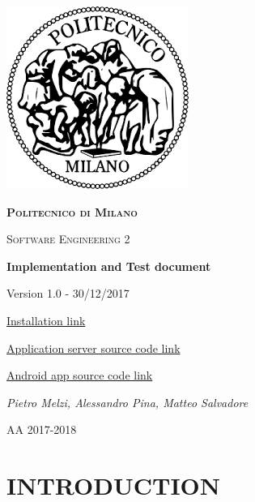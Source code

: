 \documentclass[11pt]{report}
\begin{document}
	\begin{titlepage}
		\centering
		\includegraphics{logo.png}\par\vspace{1cm}
		{\scshape\LARGE\bfseries Politecnico di Milano \par}
		\vspace{1cm}
		{\scshape\Large Software Engineering 2\par}
		\vspace{1.5cm}
		{\Huge\bfseries Implementation and Test document\par}
		\vspace{1cm}
		{\small Version 1.0 - 30/12/2017\par}
		\vspace{1cm}
		{\normalsize\href{https://github.com/JustSalva/MelziPinaSalvadore/tree/master/DeliveryFolder}{\color{blue}Installation link}\par} 
		\vspace{0.5cm}
		{\href{https://github.com/JustSalva/MelziPinaSalvadore/tree/master/Implementation/ApplicationServer}{\color{blue}Application server source code link}\par} 
		\vspace{0.5cm}
		{\href{https://github.com/JustSalva/MelziPinaSalvadore/tree/master/Implementation/AndroidApp/Travlendar}{\color{blue}Android app source code link}\par} 
		\vspace{4cm}
		{\Large\itshape Pietro Melzi, Alessandro Pina, Matteo Salvadore\par}

		\vfill

		{\large AA 2017-2018\par}
	\end{titlepage}

	\tableofcontents{}

	\chapter{INTRODUCTION}
	\label{ch:INTRODUCTION}
	
\end{document}
